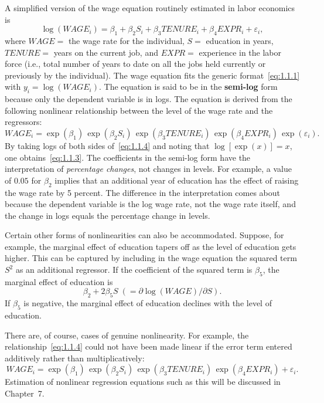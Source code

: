 \begin{example}
\label{ex:wage}
A simplified version of the wage equation routinely estimated in labor economics is
\begin{equation}
  \log(WAGE_i) = \beta_1 + \beta_2 S_i + \beta_3 TENURE_i + \beta_4 EXPR_i
    + \varepsilon_i,
  \label{eq:1.1.3}
\end{equation}
where $WAGE ={}$ the wage rate for the individual, $S ={}$ education in years,
$TENURE ={}$ years on the current job, and $EXPR ={}$ experience in the labor force
(i.e., total number of years to date on all the jobs held currently or previously by the
individual).  The wage equation fits the generic format~\eqref{eq:1.1.1} with
$y_i = \log(WAGE_i)$.  The equation is said to be in the \textbf{semi-log} form because
only the dependent variable is in logs.  The equation is derived from the following
nonlinear relationship between the level of the wage rate and the regressors:
\begin{equation}
  WAGE_i = \exp(\beta_1)\,\exp(\beta_2 S_i)\,\exp(\beta_3 TENURE_i)\,
    \exp(\beta_4 EXPR_i)\,\exp(\varepsilon_i).
  \label{eq:1.1.4}
\end{equation}
By taking logs of both sides of~\eqref{eq:1.1.4} and noting that
$\log[\exp(x)] = x$, one obtains~\eqref{eq:1.1.3}.  The coefficients in the semi-log
form have the interpretation of \emph{percentage changes}, not changes in levels.  For
example, a value of $0.05$ for $\beta_2$ implies that an additional year of education has
the effect of raising the wage rate by 5 percent.  The difference in the interpretation
comes about because the dependent variable is the log wage rate, not the wage rate itself,
and the change in logs equals the percentage change in levels.
\end{example}

Certain other forms of nonlinearities can also be accommodated.  Suppose, for example,
the marginal effect of education tapers off as the level of education gets higher.  This
can be captured by including in the wage equation the squared term $S^2$ as an additional
regressor.  If the coefficient of the squared term is $\beta_5$, the marginal effect of
education is
\[
  \beta_2 + 2\beta_5 S \;(= \partial\log(WAGE)/\partial S).
\]
If $\beta_5$ is negative, the marginal effect of education declines with the level of
education.

There are, of course, cases of genuine nonlinearity.  For example, the
relationship~\eqref{eq:1.1.4} could not have been made linear if the error term entered
additively rather than multiplicatively:
\[
  WAGE_i = \exp(\beta_1)\,\exp(\beta_2 S_i)\,\exp(\beta_3 TENURE_i)\,
    \exp(\beta_4 EXPR_i) + \varepsilon_i.
\]
Estimation of nonlinear regression equations such as this will be discussed in Chapter~7.

